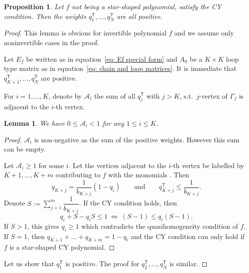 \documentclass[10pt,a4paper]{article}
\numberwithin{equation}{section}
\newtheorem{Lemma}[Theorem]{Lemma}
\newtheorem{Proposition}[Theorem]{Proposition}
 { \theoremstyle{definition}
\newtheorem{Definition}[Theorem]{Definition}
\newtheorem{Note}[Theorem]{Note}
\newtheorem{Example}[Theorem]{Example}
\newtheorem{Remark}[Theorem]{Remark} }
\def\A{{\mathcal A}}
\begin{document}
\begin{Proposition}
 Let $f$ not being a star-shaped polynomial, satisfy the CY condition. Then the weights $q_1^{\mathsf{T}}, \dots, q_N^{\mathsf{T}}$ are all positive.
\end{Proposition}
\begin{proof}
 This lemma is obvious for invertible polynomial $f$ and we assume only noninvertible cases in the proof.

 Let $E_f$ be written as in equation~\eqref{eq: Ef special form} and $A_0$ be a $K \times K$ loop type matrix as in equation~\eqref{eq: chain and loop matrices}. It is immediate that $q_{K+1}^{\mathsf{T}},\dots,q_N^{\mathsf{T}}$ are positive.

 For $i=1,\dots,K$, denote by $\A_i$ the sum of all $q_j^{\mathsf{T}}$ with $j > K$, s.t.\ $j$-vertex of $\Gamma_f$ is adjacent to the $i$-th vertex.

 \begin{Lemma}
 We have $0 \le \A_i < 1$ for any $1 \le i \le K$.
 \end{Lemma}
 \begin{proof}
 $\A_i$ is non-negative as the sum of the positive weights. However this sum can be empty.

 Let $\A_i \ge 1$ for some $i$. Let the vertices adjacent to the $i$-th vertex be labelled by $K+1,\dots,K+m$ contributing to $f$ with the monomials .
 Then
 \[
 q_{K+j} = \frac{1}{b_{K+j}}(1 - q_i) \qquad \text{and} \qquad q_{K+j}^{\mathsf{T}} \le \frac{1}{b_{K+j}}.
 \]
 Denote $S := \sum_{j=1}^m \dfrac{1}{b_{K+j}}$. If the CY condition holds, then
 \[
 q_i + S - q_i S \le 1 \ \Leftrightarrow \ (S - 1) \le q_i(S-1).
 \]
 If $S > 1$, this gives $q_i \ge 1$ which contradicts the quasihomogeneity condition of $f$. If $S=1$, then $q_{K+1} + \dots + q_{K+m} = 1 - q_i$ and the CY condition can only hold if $f$ is a star-shaped CY polynomial.
 \end{proof}

 Let us show that $q_1^{\mathsf{T}}$ is positive. The proof for $q_2^{\mathsf{T}},\dots,q_N^{\mathsf{T}}$ is similar.


\end{proof}
\end{document}
